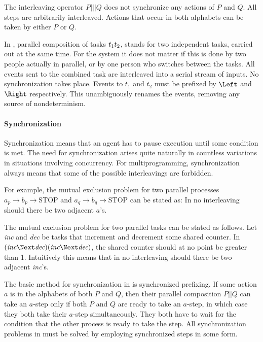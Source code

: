 The interleaving operator $P ||| Q$ does not synchronize any actions of $P$ and $Q$.
All steps are arbitrarily interleaved.
Actions that occur in both alphabets can be taken by either $P$ or $Q$.

In \TOP, parallel composition of tasks $t_1 \relax t_2$, stands for two independent tasks, carried out at the same time.
For the system it does not matter if this is done by two people actually in parallel, or by one person who switches between the tasks.
All events sent to the combined task are interleaved into a serial stream of inputs.
No synchronization takes place.
Events to $t_1$ and $t_2$ must be prefixed by $\Left$ and $\Right$ respectively.
This unambiguously renames the events, removing any source of nondeterminism.


\paragraph{Synchronization}

Synchronization means that an agent has to pause execution until some condition is met.
The need for synchronization arises quite naturally in countless variations in situations involving concurrency.
For multiprogramming, synchronization always means that some of the possible interleavings are forbidden.

For example, the mutual exclusion problem for two parallel processes $a_p \to b_p \to \text{STOP} $ and $a_q \to b_q \to \text{STOP}$ can be stated as:
In no interleaving should there be two adjacent $a$'s.

The mutual exclusion problem for two parallel tasks can be stated as follows.
Let \textit{inc} and \textit{dec} be tasks that increment and decrement some shared counter.
In $(\textit{inc} \Next \textit{dec}) \And (\textit{inc} \Next \textit{dec})$, the shared counter should at no point be greater than 1.
Intuitively this means that in no interleaving should there be two adjacent \textit{inc}'s.

The basic method for synchronization in \CSP is synchronized prefixing.
If some action $a$ is in the alphabets of both $P$ and $Q$, then their parallel composition $P||Q$ can take an $a$-step only if both $P$ and $Q$ are ready to take an $a$-step, in which case they both take their $a$-step simultaneously.
They both have to wait for the condition that the other process is ready to take the step.
All synchronization problems in \CSP must be solved by employing synchronized steps in some form.

